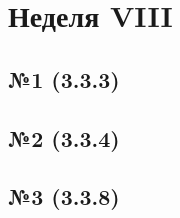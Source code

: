 \section{Неделя VIII}

\subsection*{№1 (3.3.3)} %


\subsection*{№2 (3.3.4)} %


\subsection*{№3 (3.3.8)}


% 

